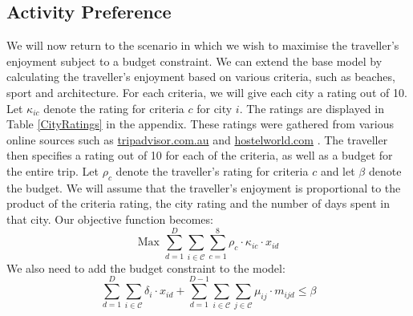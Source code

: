 \documentclass[12pt]{article}
\begin{document}
\subsection{Activity Preference}
We will now return to the scenario in which we wish to maximise the traveller's enjoyment subject to a budget constraint. We can extend the base model by calculating the traveller's enjoyment based on various criteria, such as beaches, sport and architecture. For each criteria, we will give each city a rating out of 10. Let $\kappa_{ic}$ denote the rating for criteria $c$ for city $i$. The ratings are displayed in Table \ref{CityRatings} in the appendix. These ratings were gathered from various online sources such as \url{tripadvisor.com.au} \cite{tripadvisor} and \url{hostelworld.com} \cite{hostelworld}. The traveller then specifies a rating out of 10 for each of the criteria, as well as a budget for the entire trip. Let $\rho_{c}$ denote the traveller's rating for criteria $c$ and let $\beta$ denote the budget. We will assume that the traveller's enjoyment is proportional to the product of the criteria rating, the city rating and the number of days spent in that city. Our objective function becomes:
\begin{equation*}
\text{Max   } \sum_{d=1}^{D} \sum_{i \in \mathcal{C}} \sum_{c=1}^{8} \rho_{c} \cdot \kappa_{ic} \cdot x_{id}
\end{equation*}
We also need to add the budget constraint to the model:
\begin{equation*}
\sum_{d=1}^{D} \sum_{i \in \mathcal{C}} \delta_{i} \cdot x_{id} + \sum_{d=1}^{D-1} \sum_{i \in \mathcal{C}} \sum_{j \in \mathcal{C}} \mu_{ij} \cdot m_{ijd} \leq \beta
\end{equation*}
\end{document}
